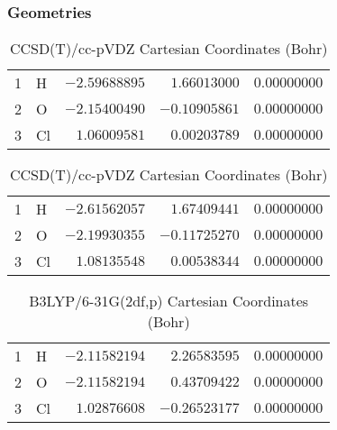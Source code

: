 \documentclass[10pt,oneside]{article}
\begin{document}
\clearpage

\subsection{}

\begin{table}[h!]
\subsubsection*{Geometries}
\begin{multicols}{2}
\centering
\caption{CCSD(T)/cc-pVTZ Cartesian Coordinates (Bohr)}
\begin{tabular}{llrrr}
\toprule
1  & H  & $-2.59688895$ & $ 1.66013000$ & $ 0.00000000$ \\
2  & O  & $-2.15400490$ & $-0.10905861$ & $ 0.00000000$ \\
3  & Cl & $ 1.06009581$ & $ 0.00203789$ & $ 0.00000000$ \\
\bottomrule
\end{tabular}
\caption{CCSD(T)/cc-pVDZ Cartesian Coordinates (Bohr)}
\begin{tabular}{llrrr}
\toprule
1  & H  & $-2.61562057$ & $ 1.67409441$ & $ 0.00000000$ \\
2  & O  & $-2.19930355$ & $-0.11725270$ & $ 0.00000000$ \\
3  & Cl & $ 1.08135548$ & $ 0.00538344$ & $ 0.00000000$ \\
\bottomrule
\end{tabular}
\end{multicols}
\end{table}

\begin{table}[h]
\centering
\caption{B3LYP/6-31G(2df,p) Cartesian Coordinates (Bohr)}
\begin{tabular}{llrrr}
\toprule
1  & H  & $-2.11582194$ & $ 2.26583595$ & $ 0.00000000$ \\
2  & O  & $-2.11582194$ & $ 0.43709422$ & $ 0.00000000$ \\
3  & Cl & $ 1.02876608$ & $-0.26523177$ & $ 0.00000000$ \\
\bottomrule
\end{tabular}
\end{table}
\end{document}

